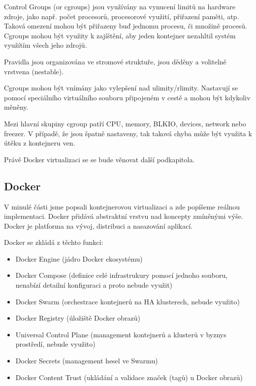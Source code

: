 \documentclass[thesis=M,czech]{FITthesis}[2019/12/23]
\theoremstyle{plain}
\theoremstyle{definition}
\begin{document}
Control Groups (or cgroups) jsou využívány na vynucení limitů na hardware zdroje, jako např. počet procesorů, procesorové využití, přiřazení paměti, atp. Taková omezení mohou být přiřazeny buď jednomu procesu, či množině procesů. Cgroups mohou být využity k zajíštění, aby jeden kontejner nezahltil systém využítím všech jeho zdrojů. 

Pravidla jsou organizována ve stromové struktuře, jsou děděny a volitelně vrstvena (nestable).

Cgroups mohou být vnímány jako vylepšení nad ulimity/rlimity. Nastavují se pomocí speciálního virtuálního souboru připojeném v cestě  a mohou být kdykoliv měněny.

Mezi hlavní skupiny cgroup patří CPU, memory, BLKIO, devices, network nebo freezer. V případě, že jsou špatně nastaveny, tak taková chyba může být využita k útěku z kontejneru ven. 


Právě Docker virtualizaci se se bude věnovat další podkapitola.

\subsection{Docker}

V minulé části jsme popsali kontejnerovou virtualizaci a zde popíšeme reálnou implementaci. Docker přidává abstraktní vrstvu nad koncepty zmíněnými výše. Docker je platforma na vývoj, distribuci a nasazování aplikací. 

Docker se zkládá z těchto funkcí:


\begin{itemize}  
\item Docker Engine (jádro Docker ekosystému)
\item Docker Compose (definice celé infrastrukury pomocí jednoho souboru, nenabízí detailní konfiguraci a proto nebude využit)
\item Docker Swarm (orchestrace kontejnerů na HA klusterech, nebude využito)
\item Docker Registry (úložiště Docker obrazů)
\item Universal Control Plane (management kontejnerů a klusterů v byznys prostředí, nebude využito)
\item Docker Secrets (management hesel ve Swarmu)
\item Docker Content Trust (ukládání a validace značek (tagů) u Docker obrazů)

\end{itemize}
\end{document}

